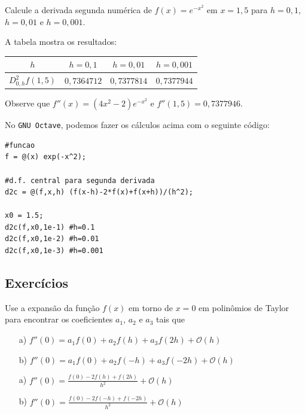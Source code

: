 \begin{ex}
Calcule a derivada segunda numérica de $f(x)=e^{-x^2}$ em $x=1,5$ para $h=0,1$, $h=0,01$ e $h=0,001$.
\end{ex}
\begin{sol}
A tabela mostra os resultados:
\begin{center}
  \begin{tabular}{|c|c|c|c|}\hline
    $h$ & $h=0,1$ & $h=0,01$ & $h=0,001$\\\hline
    $D^2_{0,h}f(1,5)$ & $0,7364712$ & $0,7377814$ & $0,7377944$\\\hline
  \end{tabular}  
\end{center}
Observe que $f''(x)=(4x^2-2)e^{-x^2}$ e $f''(1,5)=0,7377946$.  

\ifisoctave
No \verb+GNU Octave+, podemos fazer os cálculos acima com o seguinte código:
\begin{verbatim}
#funcao
f = @(x) exp(-x^2);

#d.f. central para segunda derivada
d2c = @(f,x,h) (f(x-h)-2*f(x)+f(x+h))/(h^2);

x0 = 1.5;
d2c(f,x0,1e-1) #h=0.1
d2c(f,x0,1e-2) #h=0.01
d2c(f,x0,1e-3) #h=0.001
\end{verbatim}
\fi
\end{sol}

\subsection*{Exercícios}

\begin{exer} Use a expansão da função $f(x)$ em torno de $x=0$ em polinômios de Taylor para encontrar os coeficientes $a_1$, $a_2$ e $a_3$ tais que
\begin{itemize}
\item[a)] $f''(0)=a_1f(0)+a_2f(h)+a_3f(2h) + \mathcal{O}(h)$
\item[b)] $f''(0)=a_1f(0)+a_2f(-h)+a_3f(-2h) + \mathcal{O}(h)$
\end{itemize}
\end{exer}
\begin{resp}
\begin{itemize}
\item[a)] $f''(0)=\frac{f(0)-2f(h)+f(2h)}{h^2}+\mathcal{O}(h)$
\item[b)] $f''(0)=\frac{f(0)-2f(-h)+f(-2h)}{h^2}+\mathcal{O}(h)$
\end{itemize}    
\end{resp}


